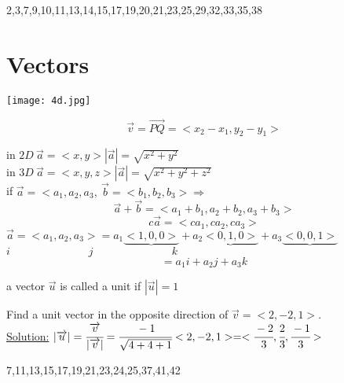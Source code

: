 \noindent{\color{smalt(darkpowderblue)}\rule{\linewidth}{.2mm}}
\begin{problem}
2,3,7,9,10,11,13,14,15,17,19,20,21,23,25,29,32,33,35,38
\end{problem}
\section{Vectors}
\begin{minipage}{0.5\textwidth}
\texttt{[image: 4d.jpg]}
\end{minipage}
\begin{minipage}{0.5\textwidth}
$$\overrightarrow{v}=\overrightarrow{PQ}=<x_2-x_1,y_2-y_1>$$
\end{minipage}
in $2D~\overrightarrow{a}=<x,y>$\hfill $|\overrightarrow{a}|=\sqrt{x^2+y^2}$\\
in $3D~\overrightarrow{a}=<x,y,z>$\hfill $|\overrightarrow{a}|=\sqrt{x^2+y^2+z^2}$\\
if $\overrightarrow{a}=<a_1,a_2,a_3,~\overrightarrow{b}=<b_1,b_2,b_3>\Rightarrow$\\
$$\overrightarrow{a}+\overrightarrow{b}=<a_1+b_1,a_2+b_2,a_3+b_3>$$
$$c\overrightarrow{a}=<ca_1,ca_2,ca_3>$$
$\overrightarrow{a}=<a_1,a_2,a_3>=a_1\underbrace{<1,0,0>}+a_2\underbrace{<0,1,0>}+a_3\underbrace{<0,0,1>}$\\
\hspace*{5.5cm} {\color{red}$i\hspace{3cm}j\hspace{3cm}k$}
$$=a_1 i+a_2 j+a_3k$$
\begin{definition}
 a vector $\overrightarrow{u}$ is called a unit if $|\overrightarrow{u}|=1$
\end{definition}
\noindent{\color{smalt(darkpowderblue)}\rule{\linewidth}{.2mm}}
\begin{example}
Find a unit vector in the opposite direction of $\overrightarrow{v}=<2,-2,1>.$\\
{\color{smalt(darkpowderblue)}\underline{Solution:}} 
$|\overrightarrow{u}|=\cfrac{\overrightarrow{v}}{|\overrightarrow{v}|}=\cfrac{-1}{\sqrt{4+4+1}}<2,-2,1>=<\cfrac{-2}{3},\cfrac{2}{3},\cfrac{-1}{3}>$
\end{example}
\noindent{\color{smalt(darkpowderblue)}\rule{\linewidth}{.2mm}}
\begin{problem}
7,11,13,15,17,19,21,23,24,25,37,41,42
\end{problem}
